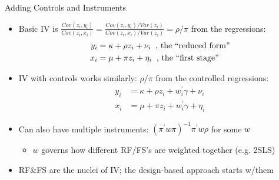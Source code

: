 \documentclass[11pt, english]{beamer}
\begin{document}
	\begin{frame}{Adding Controls and Instruments}
		\begin{itemize}
			\item Basic IV is $\frac{Cov(z_{i},y_{i})}{Cov(z_{i},x_{i})}=\frac{Cov(z_{i},y_{i})/Var(z_{i})}{Cov(z_{i},x_{i})/Var(z_{i})}
				=\rho/\pi$ from the regressions:
				\begin{align*}
					y_{i} & = \kappa + \rho z_{i} + \nu_{i} \hspace{0.2cm}\text{, the ``reduced form''} \\
					x_{i} & = \mu + \pi z_{i} + \eta_{i}\hspace{0.2cm}\text{, the ``first stage'' }
				\end{align*}\pause{}
				\vspace{-0.3cm}

			\item IV with controls works similarly: $\rho/\pi$ from the controlled
				regressions:
				\begin{align*}
					y_{i} & = \kappa + \rho z_{i} + w_{i}^{\prime}\gamma + \nu_{i} \\
					x_{i} & = \mu + \pi z_{i} + w_{i}^{\prime} \gamma + \eta_{i}
				\end{align*}\pause{}
				\vspace{-0.3cm}

			\item Can also have multiple instruments:
				$(\pi^{\prime} w \pi)^{-1}\pi^{\prime} w \rho$ for some $w$
				\smallskip
				\begin{itemize}
					\item $w$ governs how different RF/FS's are weighted together (e.g. 2SLS)
				\end{itemize}
				\medskip
				\pause{}

			\item RF\&FS are the nuclei of IV; the design-based approach starts w/them
		\end{itemize}
	\end{frame}
\end{document}
